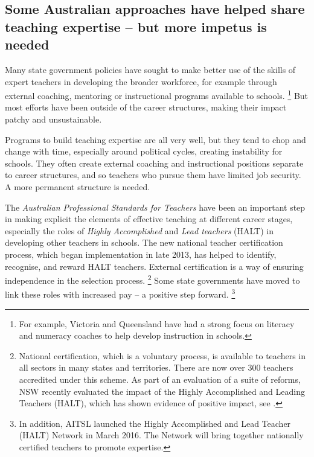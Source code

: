 \documentclass{grattan}
\begin{document}
\subsection{Some Australian approaches have helped share teaching expertise -- but more impetus is needed}\label{subsec:some Australian-approaches--open-up-access-to-expertise---but-more-impetus-is-needed}

Many state government policies have sought to make better use of the skills of expert teachers in developing the broader workforce, for example through external coaching, mentoring or instructional programs available to schools.%
\footnote{For example, Victoria and Queensland have had a strong focus on literacy and numeracy coaches to help develop instruction in schools.} But most efforts have been outside of the career structures, making their impact patchy and unsustainable.

Programs to build teaching expertise are all very well, but they tend to chop and change with time, especially around political cycles, creating instability for schools.
They often create external coaching and instructional positions separate to career structures, and so teachers who pursue them have limited job security. A more permanent structure is needed.

The \emph{Australian Professional Standards for Teachers} have been an important step in making explicit the elements of effective teaching at different career stages, especially the roles of \emph{Highly Accomplished} and \emph{Lead teachers} (HALT) in developing other teachers in schools.
The new national teacher certification process, which began implementation in late 2013, has helped to identify, recognise, and reward HALT teachers. External certification is a way of ensuring independence in the selection process.%
\footnote{National certification, which is a voluntary process, is available to teachers in all sectors in many states and territories. There are now over 300 teachers accredited under this scheme. As part of an evaluation of a suite of reforms, NSW recently evaluated the impact of the Highly Accomplished and Leading Teachers (HALT), which has shown evidence of positive impact, see \textcite{SiMERR2015EvaluationImpactSelected}.}
Some state governments have moved to link these roles with increased pay -- a positive step forward.%
\footnote{In addition, AITSL launched the Highly Accomplished and Lead Teacher (HALT) Network in March 2016. The Network will bring together nationally certified teachers to promote expertise.}
\end{document}

